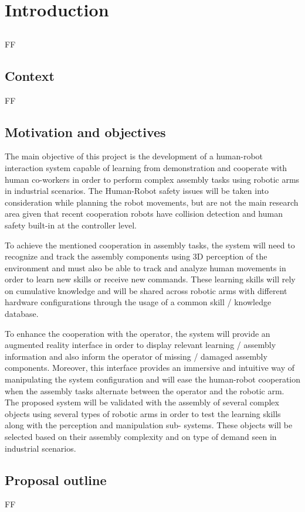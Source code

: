 \chapter{Introduction} \label{chap:introduction}



\section*{}

FF



\section{Context}\label{sec:introduction_context}

FF



\section{Motivation and objectives}\label{sec:introduction_goals}

The main objective of this project is the development of a human-robot interaction system capable of learning from demonstration and cooperate with human co-workers in order to perform complex assembly tasks using robotic arms in industrial scenarios. The Human-Robot safety issues will be taken into consideration while planning the robot movements, but are not the main research area given that recent cooperation robots have collision detection and human safety built-in at the controller level.

To achieve the mentioned cooperation in assembly tasks, the system will need to recognize and track the assembly components using 3D perception of the environment and must also be able to track and analyze human movements in order to learn new skills or receive new commands. These learning skills will rely on cumulative knowledge and will be shared across robotic arms with different hardware configurations through the usage of a common skill / knowledge database.

To enhance the cooperation with the operator, the system will provide an augmented reality interface in order to display relevant learning / assembly information and also inform the operator of missing / damaged assembly components. Moreover, this interface provides an immersive and intuitive way of manipulating the system configuration and will ease the human-robot cooperation when the assembly tasks alternate between the operator and the robotic arm. The proposed system will be validated with the assembly of several complex objects using several types of robotic arms in order to test the learning skills along with the perception and manipulation sub- systems. These objects will be selected based on their assembly complexity and on type of demand seen in industrial scenarios.



\section{Proposal outline}\label{sec:introduction_structure}

FF

